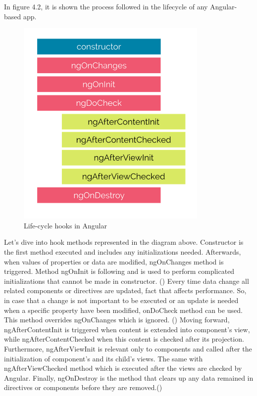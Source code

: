 In figure 4.2, it is shown the process followed in the lifecycle of any Angular-based app.

\begin{figure}[h!]
	\begin{center}
		\includegraphics[scale=0.65]{images/Lifecycle-hooks_Angular.png}
	\end{center}
	\caption{Life-cycle hooks in Angular}
\end{figure}

Let's dive into hook methods represented in the diagram above. Constructor is the first method executed and includes any initializations needed. Afterwards, when values of properties or data are modified, ngOnChanges method is triggered. Method ngOnInit is following and is used to perform complicated initializations that cannot be made in constructor. (\cite{Reference19}) Every time data change all related components or directives are updated, fact that affects performance. So, in case that a change is not important to be executed or an update is needed when a specific property have been modified, onDoCheck method can be used. This method overrides ngOnChanges which is ignored. (\cite{murray2018ng}) Moving forward, ngAfterContentInit is triggered when content is extended into component's view, while ngAfterContentChecked when this content is checked after its projection. Furthermore, ngAfterViewInit is relevant only to components and called after the initialization of component's and its child's views. The same with ngAfterViewChecked method which is executed after the views are checked by Angular. Finally, ngOnDestroy is the method that clears up any data remained in directives or components before they are removed.(\cite{Reference19}) \par


